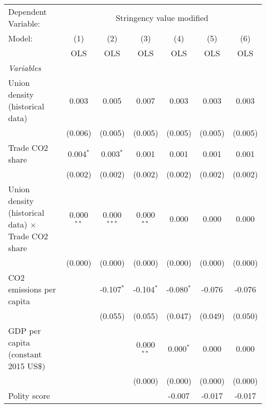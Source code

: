 
\begingroup
\centering
\begin{tabular}{lcccccc}
   \toprule
   Dependent Variable: & \multicolumn{6}{c}{Stringency value modified}\\
   Model:                                                    & (1)          & (2)           & (3)          & (4)          & (5)     & (6)\\  
                                                             &  OLS         & OLS           & OLS          & OLS          & OLS     & OLS\\  
   \midrule
   \emph{Variables}\\
   Union density (historical data)                           & 0.003        & 0.005         & 0.007        & 0.003        & 0.003   & 0.003\\   
                                                             & (0.006)      & (0.005)       & (0.005)      & (0.005)      & (0.005) & (0.005)\\   
   Trade CO2 share                                           & 0.004$^{*}$  & 0.003$^{*}$   & 0.001        & 0.001        & 0.001   & 0.001\\   
                                                             & (0.002)      & (0.002)       & (0.002)      & (0.002)      & (0.002) & (0.002)\\   
   Union density (historical data) $\times$ Trade CO2 share  & 0.000$^{**}$ & 0.000$^{***}$ & 0.000$^{**}$ & 0.000        & 0.000   & 0.000\\   
                                                             & (0.000)      & (0.000)       & (0.000)      & (0.000)      & (0.000) & (0.000)\\   
   CO2 emissions per capita                                  &              & -0.107$^{*}$  & -0.104$^{*}$ & -0.080$^{*}$ & -0.076  & -0.076\\   
                                                             &              & (0.055)       & (0.055)      & (0.047)      & (0.049) & (0.050)\\   
   GDP per capita (constant 2015 US\$)                       &              &               & 0.000$^{**}$ & 0.000$^{*}$  & 0.000   & 0.000\\   
                                                             &              &               & (0.000)      & (0.000)      & (0.000) & (0.000)\\   
   Polity score                                              &              &               &              & -0.007       & -0.017  & -0.017\\   

\end{tabular}
